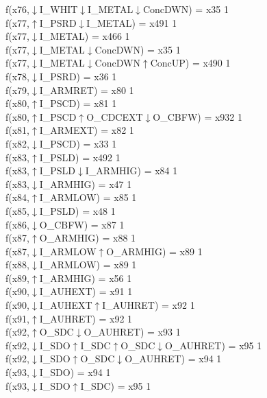 f(x76,$\downarrow$I\_WHIT$\downarrow$I\_METAL$\downarrow$ConcDWN) = x35 {1} \\
f(x77,$\uparrow$I\_PSRD$\downarrow$I\_METAL) = x491 {1} \\
f(x77,$\downarrow$I\_METAL) = x466 {1} \\
f(x77,$\downarrow$I\_METAL$\downarrow$ConcDWN) = x35 {1} \\
f(x77,$\downarrow$I\_METAL$\downarrow$ConcDWN$\uparrow$ConcUP) = x490 {1} \\
f(x78,$\downarrow$I\_PSRD) = x36 {1} \\
f(x79,$\downarrow$I\_ARMRET) = x80 {1} \\
f(x80,$\uparrow$I\_PSCD) = x81 {1} \\
f(x80,$\uparrow$I\_PSCD$\uparrow$O\_CDCEXT$\downarrow$O\_CBFW) = x932 {1} \\
f(x81,$\uparrow$I\_ARMEXT) = x82 {1} \\
f(x82,$\downarrow$I\_PSCD) = x33 {1} \\
f(x83,$\uparrow$I\_PSLD) = x492 {1} \\
f(x83,$\uparrow$I\_PSLD$\downarrow$I\_ARMHIG) = x84 {1} \\
f(x83,$\downarrow$I\_ARMHIG) = x47 {1} \\
f(x84,$\uparrow$I\_ARMLOW) = x85 {1} \\
f(x85,$\downarrow$I\_PSLD) = x48 {1} \\
f(x86,$\downarrow$O\_CBFW) = x87 {1} \\
f(x87,$\uparrow$O\_ARMHIG) = x88 {1} \\
f(x87,$\downarrow$I\_ARMLOW$\uparrow$O\_ARMHIG) = x89 {1} \\
f(x88,$\downarrow$I\_ARMLOW) = x89 {1} \\
f(x89,$\uparrow$I\_ARMHIG) = x56 {1} \\
f(x90,$\downarrow$I\_AUHEXT) = x91 {1} \\
f(x90,$\downarrow$I\_AUHEXT$\uparrow$I\_AUHRET) = x92 {1} \\
f(x91,$\uparrow$I\_AUHRET) = x92 {1} \\
f(x92,$\uparrow$O\_SDC$\downarrow$O\_AUHRET) = x93 {1} \\
f(x92,$\downarrow$I\_SDO$\uparrow$I\_SDC$\uparrow$O\_SDC$\downarrow$O\_AUHRET) = x95 {1} \\
f(x92,$\downarrow$I\_SDO$\uparrow$O\_SDC$\downarrow$O\_AUHRET) = x94 {1} \\
f(x93,$\downarrow$I\_SDO) = x94 {1} \\
f(x93,$\downarrow$I\_SDO$\uparrow$I\_SDC) = x95 {1} \\
